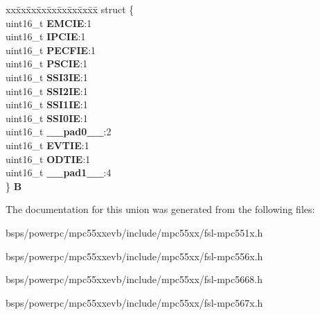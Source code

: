 \begin{DoxyCompactItemize}
\begin{tabbing}
\end{tabbing}\item 
\mbox{\label{unionuPIER1_a57b3d5b72fb4f8c673d72e5c77a1d367}} 
\begin{tabbing}
xx\=xx\=xx\=xx\=xx\=xx\=xx\=xx\=xx\=\kill
struct \{\\
\>uint16\_t {\bfseries EMCIE}:1\\
\>uint16\_t {\bfseries IPCIE}:1\\
\>uint16\_t {\bfseries PECFIE}:1\\
\>uint16\_t {\bfseries PSCIE}:1\\
\>uint16\_t {\bfseries SSI3IE}:1\\
\>uint16\_t {\bfseries SSI2IE}:1\\
\>uint16\_t {\bfseries SSI1IE}:1\\
\>uint16\_t {\bfseries SSI0IE}:1\\
\>uint16\_t {\bfseries \_\_pad0\_\_}:2\\
\>uint16\_t {\bfseries EVTIE}:1\\
\>uint16\_t {\bfseries ODTIE}:1\\
\>uint16\_t {\bfseries \_\_pad1\_\_}:4\\
\} {\bfseries B}\\

\end{tabbing}\end{DoxyCompactItemize}


The documentation for this union was generated from the following files\+:\begin{DoxyCompactItemize}
\item 
bsps/powerpc/mpc55xxevb/include/mpc55xx/fsl-\/mpc551x.\+h\item 
bsps/powerpc/mpc55xxevb/include/mpc55xx/fsl-\/mpc556x.\+h\item 
bsps/powerpc/mpc55xxevb/include/mpc55xx/fsl-\/mpc5668.\+h\item 
bsps/powerpc/mpc55xxevb/include/mpc55xx/fsl-\/mpc567x.\+h\end{DoxyCompactItemize}
